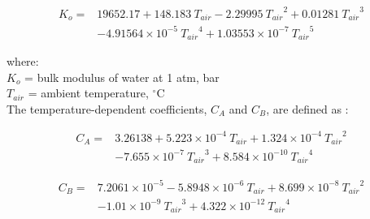 \begin{equation}
\label{eq:bulk}
	\begin{split}
		K_o = & 19652.17 + 148.183\: T_{air} 
		                 - 2.29995\: {T_{air}}^2 
		                 + 0.01281\: {T_{air}}^3 \\
		      & - 4.91564\times 10^{-5}\: {T_{air}}^4 
		        + 1.03553\times 10^{-7}\: {T_{air}}^5
	\end{split}
\end{equation}

\noindent where: \\
\indent $K_o$ = bulk modulus of water at 1 atm, bar\\
\indent $T_{air}$ = ambient temperature, $^{\circ}$C\\

\noindent The temperature-dependent coefficients, $C_A$ and $C_B$, are defined as \parencite{chen77}:

\begin{equation}
\label{eq:chena}
	\begin{split}
		C_A = & 3.26138 + 5.223\times 10^{-4}\: T_{air} 
		                + 1.324\times 10^{-4}\: {T_{air}}^2 \\
		      & - 7.655\times 10^{-7}\: {T_{air}}^3 
		        + 8.584\times 10^{-10}\: {T_{air}}^4
	\end{split}
\end{equation}

\begin{equation}
\label{eq:chenb}
	\begin{split}
		C_B = & 7.2061\times 10^{-5} - 5.8948\times 10^{-6}\: T_{air} 
		                             + 8.699\times 10^{-8}\: {T_{air}}^2 \\
		      & - 1.01\times 10^{-9}\: {T_{air}}^3 
		        + 4.322\times 10^{-12}\: {T_{air}}^4
	\end{split}
\end{equation}

